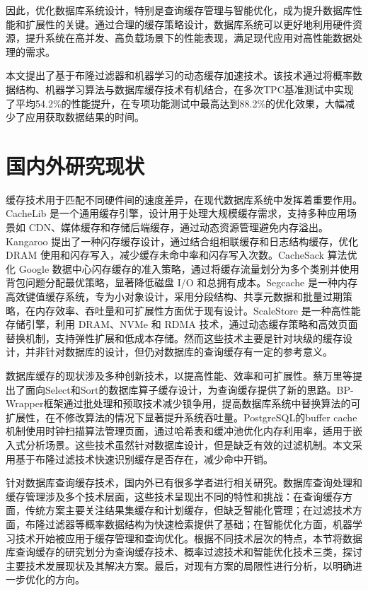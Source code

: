因此，优化数据库系统设计，特别是查询缓存管理与智能优化，成为提升数据库性能和扩展性的关键\cite{c6}。通过合理的缓存策略设计，数据库系统可以更好地利用硬件资源，提升系统在高并发、高负载场景下的性能表现，满足现代应用对高性能数据处理的需求。

本文提出了基于布隆过滤器和机器学习的动态缓存加速技术。该技术通过将概率数据结构、机器学习算法与数据库缓存技术有机结合，在多次TPC基准测试中实现了平均54.2\%的性能提升，在专项功能测试中最高达到88.2\%的优化效果，大幅减少了应用获取数据结果的时间。

\section{国内外研究现状}
缓存技术用于匹配不同硬件间的速度差异，在现代数据库系统中发挥着重要作用。CacheLib 是一个通用缓存引擎，设计用于处理大规模缓存需求，支持多种应用场景如 CDN、媒体缓存和存储后端缓存，通过动态资源管理避免内存溢出\cite{c55}。Kangaroo 提出了一种闪存缓存设计，通过结合组相联缓存和日志结构缓存，优化 DRAM 使用和闪存写入，减少缓存未命中率和闪存写入次数\cite{c56}。CacheSack 算法优化 Google 数据中心闪存缓存的准入策略，通过将缓存流量划分为多个类别并使用背包问题分配最优策略，显著降低磁盘 I/O 和总拥有成本\cite{c57}。Segcache 是一种内存高效键值缓存系统，专为小对象设计，采用分段结构、共享元数据和批量过期策略，在内存效率、吞吐量和可扩展性方面优于现有设计\cite{c58}。ScaleStore 是一种高性能存储引擎，利用 DRAM、NVMe 和 RDMA 技术，通过动态缓存策略和高效页面替换机制，支持弹性扩展和低成本存储\cite{c61}。然而这些技术主要是针对块级的缓存设计，并非针对数据库的设计，但仍对数据库的查询缓存有一定的参考意义。

数据库缓存的现状涉及多种创新技术，以提高性能、效率和可扩展性。蔡万里等提出了面向Select和Sort的数据库算子缓存设计\cite{c64}，为查询缓存提供了新的思路。BP-Wrapper框架通过批处理和预取技术减少锁争用，提高数据库系统中替换算法的可扩展性，在不修改算法的情况下显著提升系统吞吐量\cite{c59}。PostgreSQL的buffer cache机制使用时钟扫描算法管理页面，通过哈希表和缓冲池优化内存利用率，适用于嵌入式分析场景\cite{c62}。这些技术虽然针对数据库设计，但是缺乏有效的过滤机制。本文采用基于布隆过滤技术快速识别缓存是否存在，减少命中开销。

针对数据库查询缓存技术，国内外已有很多学者进行相关研究。数据库查询处理和缓存管理涉及多个技术层面，这些技术呈现出不同的特性和挑战：在查询缓存方面，传统方案主要关注结果集缓存和计划缓存，但缺乏智能化管理；在过滤技术方面，布隆过滤器等概率数据结构为快速检索提供了基础；在智能优化方面，机器学习技术开始被应用于缓存管理和查询优化。根据不同技术层次的特点，本节将数据库查询缓存的研究划分为查询缓存技术、概率过滤技术和智能优化技术三类，探讨主要技术发展现状及其解决方案。最后，对现有方案的局限性进行分析，以明确进一步优化的方向。
